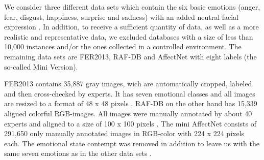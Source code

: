 \documentclass[a4paper, conference]{IEEEtran}
\begin{document}
%
%

We consider three different data sets which contain the six basic emotions (anger, fear, disgust, happiness, surprise and sadness) with an added neutral facial expression \cite{gebeleFaceValueImpact2022}. In addition, to receive a sufficient quantity of data, as well as a more realistic and representative data, we excluded databases with a size of less than 10,000 instances and/or the ones collected in a controlled environment. The remaining data sets are FER2013, RAF-DB and AffectNet with eight labels (the so-called Mini Version).

FER2013 contains 35,887 gray images, wich are automatically cropped, labeled and then cross-checked by experts. It has seven emotional classes and all images are resized to a format of 48 x 48 pixels \cite{goodfellowChallengesRepresentationLearning2013}. RAF-DB on the other hand has 15,339 aligned colorful RGB-images. All images were manually annotated by about 40 experts and aligned to a size of 100 x 100 pixels \cite{liReliableCrowdsourcingDeep2017}. The mini AffectNet consists of 291,650 only manually annotated images in RGB-color with 224 x 224 pixels each. The emotional state contempt was removed in addition to leave us with the same seven emotions as in the other data sets \cite{mollahosseiniAffectnetDatabaseFacial2017}.
\end{document}
